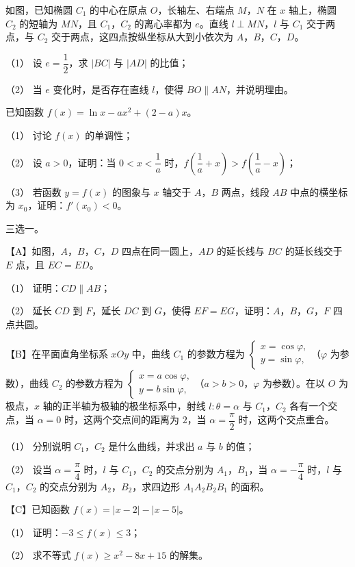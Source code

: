 \begin{question}
如图，已知椭圆 $C_1$ 的中心在原点 $O$，长轴左、右端点 $M$，$N$ 在 $x$ 轴上，椭圆 $C_2$ 的短轴为 $MN$，且 $C_1$，$C_2$ 的离心率都为 $e$。直线 $l\perp MN$，$l$ 与 $C_1$ 交于两点，与 $C_2$ 交于两点，这四点按纵坐标从大到小依次为 $A$，$B$，$C$，$D$。

（1） 设 $e=\dfrac12$，求 $|BC|$ 与 $|AD|$ 的比值；

（2） 当 $e$ 变化时，是否存在直线 $l$，使得 $BO\parallel AN$，并说明理由。
\nopagebreak[4]
\begin{center}\end{center}
\nopagebreak[4]
\end{question}
\begin{question}
已知函数 $f(x)=\ln x-ax^2+(2-a)x$。

（1） 讨论 $f(x)$ 的单调性；

（2） 设 $a>0$，证明：当 $0<x<\dfrac1a$ 时，$f\left(\dfrac1a+x\right)>f\left(\dfrac1a-x\right)$；

（3） 若函数 $y=f(x)$ 的图象与 $x$ 轴交于 $A$，$B$ 两点，线段 $AB$ 中点的横坐标为 $x_0$，证明：$f'(x_0)<0$。

\Needspace{0.4\textheight}
\end{question}
\begin{question}
三选一。

【A】如图，$A$，$B$，$C$，$D$ 四点在同一圆上，$AD$ 的延长线与 $BC$ 的延长线交于 $E$ 点，且 $EC=ED$。

（1） 证明：$CD\parallel AB$；

（2） 延长 $CD$ 到 $F$，延长 $DC$ 到 $G$，使得 $EF=EG$，证明：$A$，$B$，$G$，$F$ 四点共圆。
\nopagebreak[4]
\begin{center}\end{center}
\nopagebreak[4]
【B】在平面直角坐标系 $xOy$ 中，曲线 $C_1$ 的参数方程为 $\begin{cases}x=\cos\varphi,\\y=\sin\varphi,\end{cases}$（$\varphi$ 为参数），曲线 $C_2$ 的参数方程为 $\begin{cases}x=a\cos\varphi,\\y=b\sin\varphi,\end{cases}$（$a>b>0$，$\varphi$ 为参数）。在以 $O$ 为极点，$x$ 轴的正半轴为极轴的极坐标系中，射线 $l:\theta=\alpha$ 与 $C_1$，$C_2$ 各有一个交点，当 $\alpha=0$ 时，这两个交点间的距离为 $2$，当 $\alpha=\dfrac\pi2$ 时，这两个交点重合。

（1） 分别说明 $C_1$，$C_2$ 是什么曲线，并求出 $a$ 与 $b$ 的值；

（2） 设当 $\alpha=\dfrac\pi4$ 时，$l$ 与 $C_1$，$C_2$ 的交点分别为 $A_1$，$B_1$，当 $\alpha=-\dfrac\pi4$ 时，$l$ 与 $C_1$，$C_2$ 的交点分别为 $A_2$，$B_2$，求四边形 $A_1A_2B_2B_1$ 的面积。

【C】已知函数 $f(x)=|x-2|-|x-5|$。

（1） 证明：$-3\leqslant f(x)\leqslant3$；

（2） 求不等式 $f(x)\geqslant x^2-8x+15$ 的解集。

\end{question}